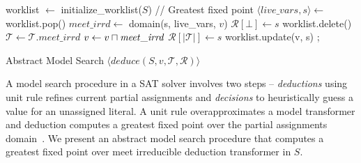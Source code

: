 \begin{algorithm2e}[t]
\DontPrintSemicolon
{}
\begin{small}
worklist $\leftarrow$ initialize\_worklist($S$) \;
\Loop{}
{
// Greatest fixed point \;
{
  $\langle live\_vars, s \rangle \leftarrow$ worklist.pop() \;
  $\mathit{meet\_irrd} \leftarrow$ domain(s, live\_vars, $v$)\;
   {
    $\mathcal{R}[\bot] \leftarrow s$ \;
    worklist.delete() \;
    \return \conflict \;
  }
  \uElse
  {
    $\mathcal{T} \leftarrow \mathcal{T} . \mathit{meet\_irrd}$ \; 
    $v \leftarrow v \sqcap \mathit{meet\_irrd}$ \; 
    $\mathcal{R}[|\mathcal{T}|] \leftarrow s$ \;
    worklist.update(v, s) \; 
  }
}
 {
  \return \sat;
}
\uElse {
 \return \unknown \;
}
}
\end{small}
\caption{Abstract Model Search $\langle deduce(S,v,\mathcal{T},\mathcal{R}) \rangle$ \label{Alg:ms}}
\end{algorithm2e}
%  
A model search procedure in a SAT solver involves two steps -- {\em deductions} 
using unit rule refines current partial assignments and 
{\em decisions} to heuristically guess a value for an unassigned 
literal.  A unit rule overapproximates a model transformer and deduction 
computes a greatest fixed point over the partial assignments
domain~\cite{dhk2013-popl}.  We present an abstract model search procedure 
that computes a greatest fixed point over meet irreducible deduction 
transformer in $S$.  
%
